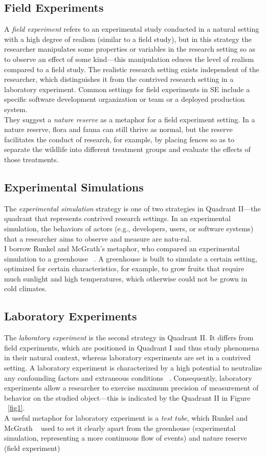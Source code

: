 \documentclass[runningheads]{llncs}
\begin{document}
\subsection{Field Experiments}
A \emph{field experiment} refers to an experimental study conducted in a natural setting with a high degree of realism (similar to a field study), but in this strategy the researcher manipulates some properties or variables in the research setting so as to observe an effect of some kind—this manipulation educes the level of realism compared to a field study. The realistic research setting exists independent of the researcher, which distinguishes it from the contrived research setting in a laboratory experiment. Common settings for field experiments in SE include a specific software development organization or team or a deployed production system.
\\
They suggest a \emph{nature reserve} as a metaphor for a field experiment setting. In a nature reserve, flora and fauna can still thrive as normal, but the reserve facilitates the conduct of research, for example, by placing fences so as to separate the wildlife into different treatment groups and evaluate the effects of those treatments.
\subsection{Experimental Simulations}
The \emph{experimental simulation} strategy is one of two strategies in Quadrant II—the quadrant that represents contrived research settings. In an experimental simulation, the behaviors of actors (e.g., developers, users, or software systems) that a researcher aims to observe and measure are natu-ral.
\\
I borrow Runkel and McGrath’s metaphor, who compared an experimental simulation to a
greenhouse ~\cite{ref_article6}. A greenhouse is built to simulate a certain setting, optimized for certain characteristics, for example, to grow fruits that require much sunlight and high temperatures, which otherwise could not be grown in cold climates.

\subsection{Laboratory Experiments}

The \emph{laboratory experiment} is the second strategy in Quadrant II. It differs from field experiments, which are positioned in Quadrant I and thus study phenomena in their natural context, whereas laboratory experiments are set in a contrived setting. A laboratory experiment is characterized by a high potential to neutralize any confounding factors and extraneous conditions ~\cite{ref_article6}. Consequently, laboratory experiments allow a researcher to exercise maximum precision of measurement of behavior on the studied object—this is indicated by the Quadrant II in Figure ~\ref{fig1}.
\\
A useful metaphor for laboratory experiment is a \emph{test tube}, which Runkel and McGrath ~\cite{ref_article6} used to set it clearly apart from the greenhouse (experimental simulation, representing a more continuous flow of events) and nature reserve (field experiment)
\end{document}
